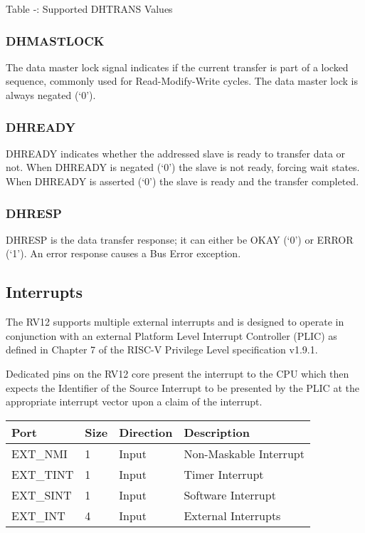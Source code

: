 Table ‑: Supported DHTRANS Values

\subsubsection{DHMASTLOCK}\label{dhmastlock}

The data master lock signal indicates if the current transfer is part of
a locked sequence, commonly used for Read-Modify-Write cycles. The data
master lock is always negated (`0').

\subsubsection{DHREADY}\label{dhready}

DHREADY indicates whether the addressed slave is ready to transfer data
or not. When DHREADY is negated (`0') the slave is not ready, forcing
wait states. When DHREADY is asserted (`0') the slave is ready and the
transfer completed.

\subsubsection{DHRESP}\label{dhresp}

DHRESP is the data transfer response; it can either be OKAY (`0') or
ERROR (`1'). An error response causes a Bus Error exception.

\subsection{Interrupts}\label{interrupts}

The RV12 supports multiple external interrupts and is designed to
operate in conjunction with an external Platform Level Interrupt
Controller (PLIC) as defined in Chapter 7 of the RISC-V Privilege Level
specification v1.9.1.

Dedicated pins on the RV12 core present the interrupt to the CPU which
then expects the Identifier of the Source Interrupt to be presented by
the PLIC at the appropriate interrupt vector upon a claim of the
interrupt.

\begin{longtable}[]{@{}llll@{}}
\toprule
Port & Size & Direction & Description\tabularnewline
\midrule
\endhead
EXT\_NMI & 1 & Input & Non-Maskable Interrupt\tabularnewline
EXT\_TINT & 1 & Input & Timer Interrupt\tabularnewline
EXT\_SINT & 1 & Input & Software Interrupt\tabularnewline
EXT\_INT & 4 & Input & External Interrupts\tabularnewline
\bottomrule
\end{longtable}

